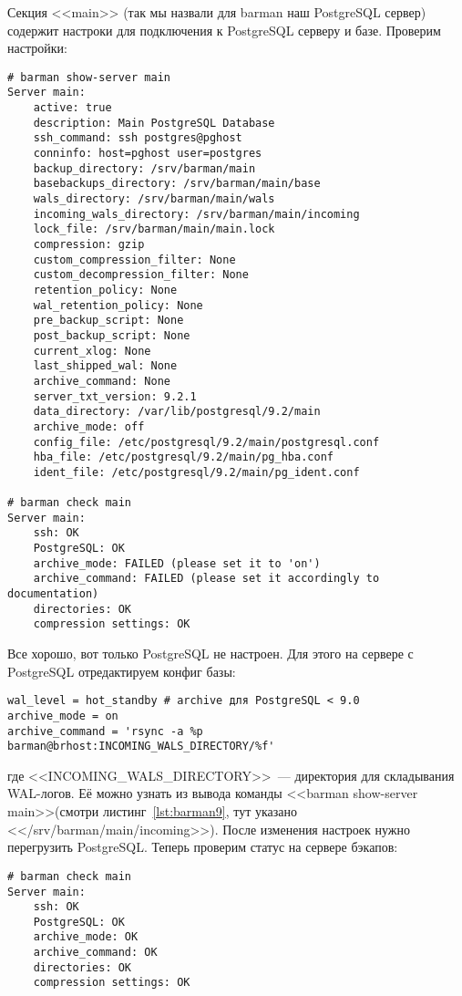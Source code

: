 Секция <<main>> (так мы назвали для barman наш PostgreSQL сервер) содержит настроки для подключения к PostgreSQL серверу и базе. Проверим настройки:

\begin{lstlisting}[label=lst:barman9,caption=Проверка barman настроек]
# barman show-server main
Server main:
	active: true
	description: Main PostgreSQL Database
	ssh_command: ssh postgres@pghost
	conninfo: host=pghost user=postgres
	backup_directory: /srv/barman/main
	basebackups_directory: /srv/barman/main/base
	wals_directory: /srv/barman/main/wals
	incoming_wals_directory: /srv/barman/main/incoming
	lock_file: /srv/barman/main/main.lock
	compression: gzip
	custom_compression_filter: None
	custom_decompression_filter: None
	retention_policy: None
	wal_retention_policy: None
	pre_backup_script: None
	post_backup_script: None
	current_xlog: None
	last_shipped_wal: None
	archive_command: None
	server_txt_version: 9.2.1
	data_directory: /var/lib/postgresql/9.2/main
	archive_mode: off
	config_file: /etc/postgresql/9.2/main/postgresql.conf
	hba_file: /etc/postgresql/9.2/main/pg_hba.conf
	ident_file: /etc/postgresql/9.2/main/pg_ident.conf

# barman check main
Server main:
	ssh: OK
	PostgreSQL: OK
	archive_mode: FAILED (please set it to 'on')
	archive_command: FAILED (please set it accordingly to documentation)
	directories: OK
	compression settings: OK
\end{lstlisting}

Все хорошо, вот только PostgreSQL не настроен. Для этого на сервере с PostgreSQL отредактируем конфиг базы:

\begin{lstlisting}[label=lst:barman10,caption=Настройка PostgreSQL]
wal_level = hot_standby # archive для PostgreSQL < 9.0
archive_mode = on
archive_command = 'rsync -a %p barman@brhost:INCOMING_WALS_DIRECTORY/%f'
\end{lstlisting}

где <<INCOMING\_WALS\_DIRECTORY>>~--- директория для складывания WAL-логов. Её можно узнать из вывода команды <<barman show-server main>>(смотри листинг~\ref{lst:barman9}, тут указано  <</srv/barman/main/incoming>>). После изменения настроек нужно перегрузить PostgreSQL. Теперь проверим статус на сервере бэкапов:

\begin{lstlisting}[label=lst:barman11,caption=Проверка]
# barman check main
Server main:
	ssh: OK
	PostgreSQL: OK
	archive_mode: OK
	archive_command: OK
	directories: OK
	compression settings: OK
\end{lstlisting}

